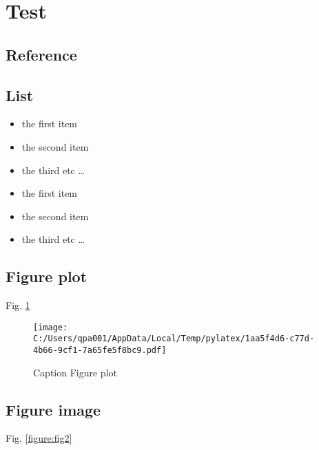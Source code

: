 \documentclass{article}%
\begin{document}
%
\newpage%
\section{Test}%
\label{sec:Test}%
\subsection{Reference}%
\label{subsec:Reference}%
\cite{bertram}%
\linebreak%
\cite{simon06}%
\linebreak

%
\subsection{List}%
\label{subsec:List}%
\begin{itemize}%
\item%
the first item%
\item%
the second item%
\item%
the third etc%
\ldots%
\end{itemize}%
\begin{itemize}%
\item%
the first item%
\item%
the second item%
\item%
the third etc%
\ldots%
\end{itemize}

%
\subsection{Figure plot}%
\label{subsec:Figureplot}%
Fig. \ref{figure:fig1}%


\begin{figure}[h!]%
\centering%
\texttt{[image: C:/Users/qpa001/AppData/Local/Temp/pylatex/1aa5f4d6-c77d-4b66-9cf1-7a65fe5f8bc9.pdf]}%
\caption{Caption Figure plot}%
\label{figure:fig1}%
\end{figure}

%
\subsection{Figure image}%
\label{subsec:Figureimage}%
Fig. \ref{figure:fig2}

%
\end{document}
